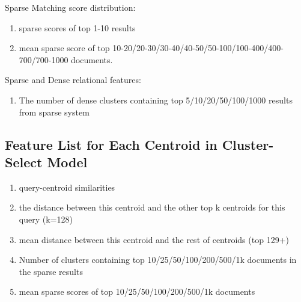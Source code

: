 {Sparse Matching score distribution:
\begin{enumerate}
    \item sparse scores of top 1-10 results
    \item mean sparse score of top 10-20/20-30/30-40/40-50/50-100/100-400/400-700/700-1000 documents.
\end{enumerate}


Sparse and Dense relational features:
\begin{enumerate}
    \item The number of dense clusters containing top 5/10/20/50/100/1000 results from sparse system
\end{enumerate}


\subsection{Feature List for Each Centroid in Cluster-Select Model}

\begin{enumerate}
    \item query-centroid similarities
    \item the distance between this centroid and the other top k centroids for this query (k=128)
    \item mean distance between this centroid and the rest of centroids (top 129+)
    \item Number of clusters containing top 10/25/50/100/200/500/1k documents in the sparse results
    \item mean sparse scores of top 10/25/50/100/200/500/1k documents 
\end{enumerate}

\begin{table}[ht]
    \centering
\caption{Splade Expansion Example on Query Quality}
\label{tab:example}
\end{table}

}

